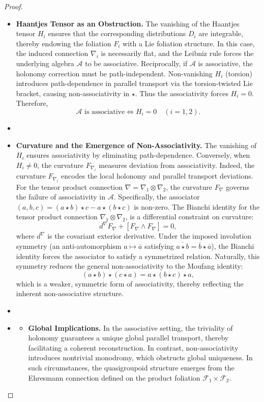 \documentclass[runningheads]{llncs}
\begin{document}
\begin{proof}~
\begin{itemize}
\item[(1)] \textbf{Haantjes Tensor as an Obstruction.} The vanishing of the Haantjes tensor $H_i$	
ensures that the corresponding distributions $D_i$	
are integrable, thereby endowing the foliation 
$F_i$ with a Lie foliation structure. In this case, the induced connection $\nabla_i$	
 is necessarily flat, and the Leibniz rule forces the underlying algebra 
$\mathcal{A}$ to be associative. Reciprocally, if $\mathcal{A}$ is associative, the holonomy correction must be path-independent. Non-vanishing $H_i$ (torsion) introduces path-dependence in parallel transport via the torsion-twisted Lie bracket, causing non-associativity in $\star$. Thus the associativity forces $H_i=0$.
Therefore, \[\mathcal{A} \text{ is associative} \iff H_i = 0 \quad (i = 1, 2).\]
\item[]
\item[(2)] \textbf{Curvature and the Emergence of Non-Associativity.} The vanishing of $H_i$ ensures associativity by eliminating path-dependence. Conversely, when \(H_i \neq 0\), the curvature \(F_{\nabla_i}\) measures deviation from associativity. Indeed, the curvature  \(F_{\nabla_i}\) encodes the local holonomy and parallel transport deviations. For the tensor product connection  \(\nabla=\nabla_1 \otimes \nabla_2\), the curvature \(F_{\nabla}\) governs the failure of associativity in $\mathcal{A}$. Specifically, the associator $(a,b,c)=(a\star b)\star c-a\star (b\star c) $ is non-zero. The Bianchi identity for the tensor product connection \(\nabla_1 \otimes \nabla_2\), is a differential constraint on curvature: \[d^{\nabla}F_{\nabla}+[F_{\nabla}\wedge F_{\nabla}]=0,\] where $d^{\nabla}$ is the covariant exterior derivative. Under the imposed involution symmetry (an anti-automorphism $a\mapsto \overline{a}$ satisfying $ \overline{a\star b}= \overline{b}\star \overline{a}$), the Bianchi identity forces the associator to satisfy a symmetrized relation. Naturally, this symmetry reduces the general non-associativity to the Moufang identity: \[(a\star b)\star (c\star a)=a\star (b\star c)\star a, \] which is a weaker, symmetric form of associativity, thereby reflecting the inherent non-associative structure.
\item[]
\item[(3)] \begin{itemize}
\item \textbf{Global Implications.} In the associative setting, the triviality of holonomy guarantees a unique global parallel transport, thereby facilitating a coherent reconstruction. In contrast, non-associativity introduces nontrivial monodromy, which obstructs global uniqueness. In such circumstances, the quasigroupoid structure emerges from the Ehresmann connection defined on the product foliation \(\mathcal{F}_1 \times \mathcal{F}_2\).


\end{itemize}
\end{itemize}
\end{proof}
\end{document}
